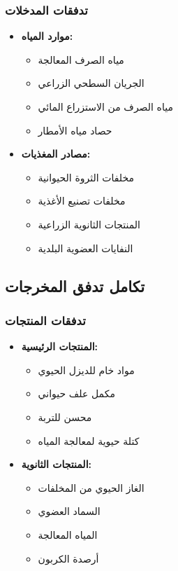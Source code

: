 \subsubsection{تدفقات المدخلات}
\begin{itemize}
    \item \textbf{موارد المياه:}
    \begin{itemize}
        \item مياه الصرف المعالجة
        \item الجريان السطحي الزراعي
        \item مياه الصرف من الاستزراع المائي
        \item حصاد مياه الأمطار
    \end{itemize}
    
    \item \textbf{مصادر المغذيات:}
    \begin{itemize}
        \item مخلفات الثروة الحيوانية
        \item مخلفات تصنيع الأغذية
        \item المنتجات الثانوية الزراعية
        \item النفايات العضوية البلدية
    \end{itemize}
\end{itemize}

\subsection{تكامل تدفق المخرجات}

\subsubsection{تدفقات المنتجات}
\begin{itemize}
    \item \textbf{المنتجات الرئيسية:}
    \begin{itemize}
        \item مواد خام للديزل الحيوي
        \item مكمل علف حيواني
        \item محسن للتربة
        \item كتلة حيوية لمعالجة المياه
    \end{itemize}
    
    \item \textbf{المنتجات الثانوية:}
    \begin{itemize}
        \item الغاز الحيوي من المخلفات
        \item السماد العضوي
        \item المياه المعالجة
        \item أرصدة الكربون
    \end{itemize}
\end{itemize}

